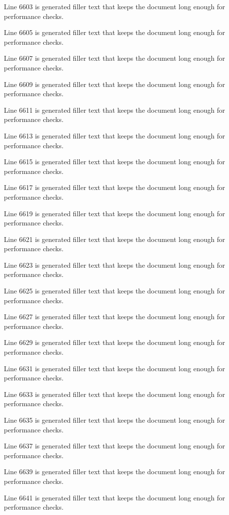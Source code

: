 Line 6603 is generated filler text that keeps the document long enough for performance checks.

Line 6605 is generated filler text that keeps the document long enough for performance checks.

Line 6607 is generated filler text that keeps the document long enough for performance checks.

Line 6609 is generated filler text that keeps the document long enough for performance checks.

Line 6611 is generated filler text that keeps the document long enough for performance checks.

Line 6613 is generated filler text that keeps the document long enough for performance checks.

Line 6615 is generated filler text that keeps the document long enough for performance checks.

Line 6617 is generated filler text that keeps the document long enough for performance checks.

Line 6619 is generated filler text that keeps the document long enough for performance checks.

Line 6621 is generated filler text that keeps the document long enough for performance checks.

Line 6623 is generated filler text that keeps the document long enough for performance checks.

Line 6625 is generated filler text that keeps the document long enough for performance checks.

Line 6627 is generated filler text that keeps the document long enough for performance checks.

Line 6629 is generated filler text that keeps the document long enough for performance checks.

Line 6631 is generated filler text that keeps the document long enough for performance checks.

Line 6633 is generated filler text that keeps the document long enough for performance checks.

Line 6635 is generated filler text that keeps the document long enough for performance checks.

Line 6637 is generated filler text that keeps the document long enough for performance checks.

Line 6639 is generated filler text that keeps the document long enough for performance checks.

Line 6641 is generated filler text that keeps the document long enough for performance checks.

